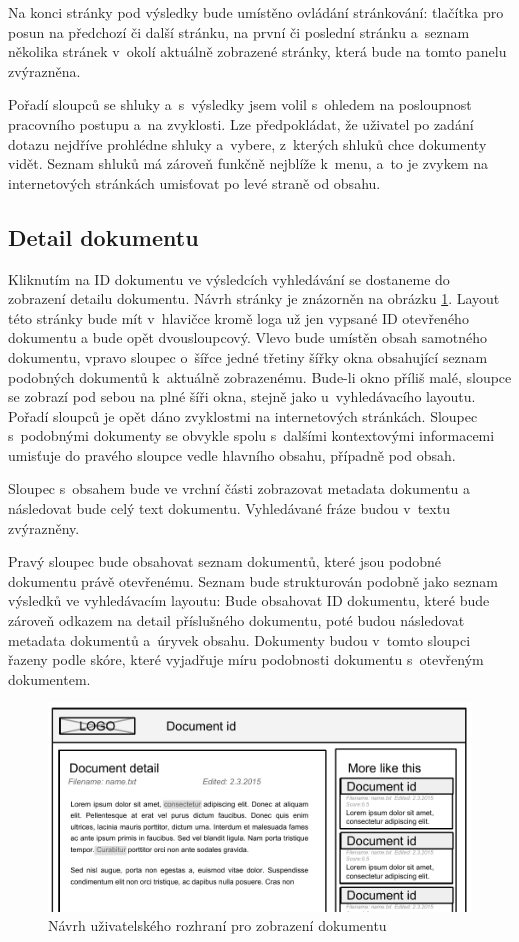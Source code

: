 Na konci stránky pod výsledky bude umístěno ovládání stránkování: tlačítka pro posun na předchozí či další stránku, na první či poslední stránku a~seznam několika stránek v~okolí aktuálně zobrazené stránky, která bude na tomto panelu zvýrazněna.

Pořadí sloupců se shluky a~s~výsledky jsem volil s~ohledem na posloupnost pracovního postupu a~na zvyklosti. Lze předpokládat, že uživatel po zadání dotazu nejdříve prohlédne shluky a~vybere, z~kterých shluků chce dokumenty vidět. Seznam shluků má zároveň funkčně nejblíže k~menu, a~to je zvykem na internetových stránkách umisťovat po levé straně od obsahu.

\subsection{Detail dokumentu}
Kliknutím na ID dokumentu ve výsledcích vyhledávání se dostaneme do zobrazení detailu dokumentu. Návrh stránky je znázorněn na obrázku \ref{fig:DetailLayout}. Layout této stránky bude mít v~hlavičce kromě loga už jen vypsané ID otevřeného dokumentu a bude opět dvousloupcový. Vlevo bude umístěn obsah samotného dokumentu, vpravo sloupec o~šířce jedné třetiny šířky okna obsahující seznam podobných dokumentů k~aktuálně zobrazenému. Bude-li okno příliš malé, sloupce se zobrazí pod sebou na plné šíři okna, stejně jako u~vyhledávacího layoutu. Pořadí sloupců je opět dáno zvyklostmi na internetových stránkách. Sloupec s~podobnými dokumenty se obvykle spolu s~dalšími kontextovými informacemi umisťuje  do pravého sloupce vedle hlavního obsahu, případně pod obsah.

Sloupec s~obsahem bude ve vrchní části zobrazovat metadata dokumentu a následovat bude celý text dokumentu. Vyhledávané fráze budou v~textu zvýrazněny. 

Pravý sloupec bude obsahovat seznam dokumentů, které jsou podobné dokumentu právě otevřenému. Seznam bude strukturován podobně jako seznam výsledků ve vyhledávacím layoutu: Bude obsahovat ID dokumentu, které bude zároveň odkazem na detail příslušného dokumentu, poté budou následovat metadata dokumentů a~úryvek obsahu. Dokumenty budou v~tomto sloupci řazeny podle skóre, které vyjadřuje míru podobnosti dokumentu s~otevřeným dokumentem.

\begin{figure}[h]
\begin{center}
\includegraphics[width=13cm]{DetailLayout}
\caption{Návrh uživatelského rozhraní pro zobrazení dokumentu}
\label{fig:DetailLayout}
\end{center}
\end{figure}